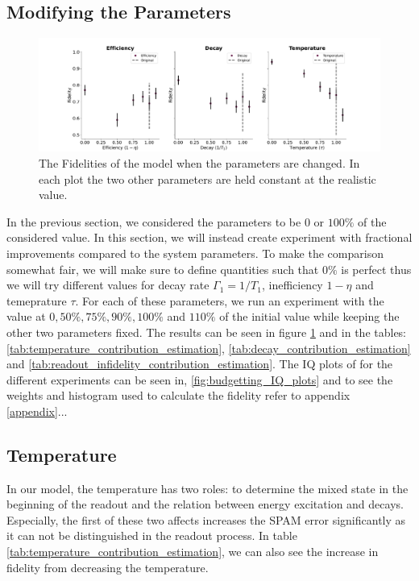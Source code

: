 \subsection{Modifying the Parameters}
\begin{figure}[t]
    \centering
    \includegraphics[width = \linewidth]{Simulations/budgets/figures/fidelities_at_different_parameters.pdf}
    \caption{The Fidelities of the model when the parameters are changed. In each plot the two other parameters are held constant at the realistic value.}
    \label{fig:scan_of_fidelities_at_different_parameters}
\end{figure}
In the previous section, we considered the parameters to be $0$ or $100 \%$ of the considered value. In this section, we will instead create experiment with fractional improvements compared to the system parameters. To make the comparison somewhat fair, we will make sure to define quantities such that $0\%$ is perfect thus we will try different values for decay rate $\Gamma_1 = 1 / T_1$, inefficiency $1 - \eta$ and temeprature $\tau$. For each of these parameters, we run an experiment with the value at $0, 50\%, 75\%, 90\%, 100\%$ and $110\%$ of the initial value while keeping the other two parameters fixed. The results can be seen in figure \ref{fig:scan_of_fidelities_at_different_parameters} and in the tables: \ref{tab:temperature_contribution_estimation}, \ref{tab:decay_contribution_estimation} and \ref{tab:readout_infidelity_contribution_estimation}. The IQ plots of for the different experiments can be seen in, \ref{fig:budgetting_IQ_plots} and to see the weights and histogram used to calculate the fidelity refer to appendix \ref{appendix}... 


\subsection{Temperature}
In our model, the temperature has two roles: to determine the mixed state in the beginning of the readout and the relation between energy excitation and decays. Especially, the first of these two affects increases the SPAM error significantly as it can not be distinguished in the readout process. In table \ref{tab:temperature_contribution_estimation}, we can also see the increase in fidelity from decreasing the temperature. 


